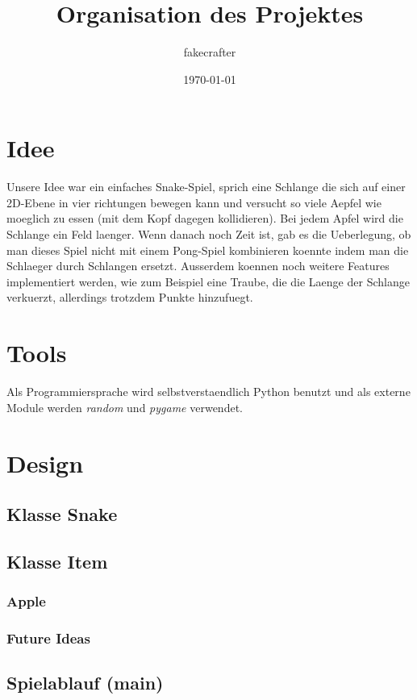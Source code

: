 \documentclass[11pt]{article}
\author{fakecrafter}
\date{\today}
\title{Organisation des Projektes}
\begin{document}
\maketitle
\tableofcontents


\section{Idee}
\label{sec:org173f495}
Unsere Idee war ein einfaches Snake-Spiel, sprich eine Schlange die sich auf einer 2D-Ebene in vier richtungen bewegen kann und versucht so viele Aepfel wie moeglich zu essen (mit dem Kopf dagegen kollidieren). Bei jedem Apfel wird die Schlange ein Feld laenger.
Wenn danach noch Zeit ist, gab es die Ueberlegung, ob man dieses Spiel nicht mit einem Pong-Spiel kombinieren koennte indem man die Schlaeger durch Schlangen ersetzt.
Ausserdem koennen noch weitere Features implementiert werden, wie zum Beispiel eine Traube, die die Laenge der Schlange verkuerzt, allerdings trotzdem Punkte hinzufuegt.
\section{Tools}
\label{sec:orgb1bf631}
Als Programmiersprache wird selbstverstaendlich Python benutzt und als externe Module werden \emph{random} und \emph{pygame} verwendet.
\section{Design}
\label{sec:orgdd1a3cb}
\subsection{Klasse Snake}
\label{sec:org21922b5}
\subsection{Klasse Item}
\label{sec:org8ed0010}
\subsubsection{Apple}
\label{sec:orgbaa6d28}
\subsubsection{Future Ideas}
\label{sec:org378a3c6}
\subsection{Spielablauf (main)}
\label{sec:org1b75167}
\end{document}
